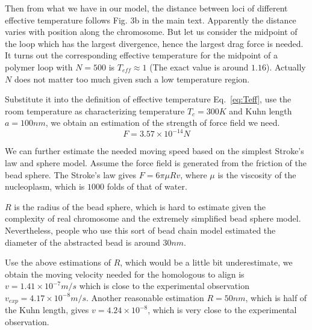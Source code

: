 \documentclass{article}
\begin{document}
Then from what we have in our model, the distance between loci of different effective temperature follows Fig. 3b in the main text.
Apparently the distance varies with position along the chromosome. 
But let us consider the midpoint of the loop which has the largest divergence, hence the largest drag force is needed.
It turns out the corresponding effective temperature for the midpoint of a polymer loop with $N=500$ is $T_{eff}\approx 1$ (The exact value is around $1.16$). 
Actually $N$ does not matter too much given such a low temperature region. 

Substitute it into the definition of effective temperature Eq.~\ref{eq:Teff}, use the room temperature as characterizing temperature $T_c = 300K$ and Kuhn length $a = 100nm$, we obtain an estimation of the strength of force field we need.
\begin{equation}
	F = 3.57\times10^{-14} N
\end{equation}

We can further estimate the needed moving speed based on the simplest Stroke's law and sphere model. 
Assume the force field is generated from the friction of the bead sphere. 
The Stroke's law gives $F= 6\pi \mu R v$, where $\mu$ is the viscosity of the nucleoplasm, which is $1000$ folds of that of water.

$R$ is the radius of the bead sphere, which is hard to estimate given the complexity of real chromosome and the extremely simplified bead sphere model.
Nevertheless, people who use this sort of bead chain model estimated the diameter of the abstracted bead is around $30nm$\cite{Rosa2008}.

Use the above estimations of $R$, which would be a little bit underestimate, we obtain the moving velocity needed for the homologous to align is $v = 1.41\times10^{-7} m/s$ which is close to the experimental observation $v_{exp} = 4.17\times10^{-8}m/s$.
Another reasonable estimation $R=50nm$, which is half of the Kuhn length, gives $v = 4.24\times10^{-8}$, which is very close to the experimental observation.


% 

\end{document}
